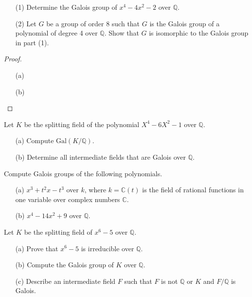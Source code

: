 \begin{prob}[F2016-Q4]
    \phantom{text}
    \begin{itemize}
        \item[(1)] Determine the Galois group of \(x^{4}-4x^{2}-2\) over \(\mathbb{Q}\).
        \item[(2)] Let \(G\) be a group of order 8 such that \(G\) is the Galois group of a polynomial of degree 4 over \(\mathbb{Q}\). Show that \(G\) is isomorphic to the Galois group in part (1).
    \end{itemize}
\end{prob}
\begin{proof}
    \begin{itemize}
        \item[(a)]
        







        \item[(b)] 
    \end{itemize}
\end{proof}


\begin{prob}[S2008-Q3]
    Let \(K\) be the splitting field of the polynomial \(X^4 - 6X^2 - 1\) over \(\mathbb{Q}\).
    \begin{itemize}
        \item[(a)] Compute \(\text{Gal}(K/\mathbb{Q})\).
        \item[(b)] Determine all intermediate fields that are Galois over \(\mathbb{Q}\).
    \end{itemize}
\end{prob}


\begin{prob}[S2010-Q3]
    Compute Galois groups of the following polynomials.
    \begin{itemize}
        \item[(a)] \(x^3 + t^2x - t^3\) over \(k\), where \(k = \mathbb{C}(t)\) is the field of rational functions in one variable over complex numbers \(\mathbb{C}\).
        \item[(b)] \(x^4 - 14x^2 + 9\) over \(\mathbb{Q}\).
    \end{itemize}
\end{prob}

\begin{prob}[S2013-Q6]
    Let \(K\) be the splitting field of \(x^6 - 5\) over \(\mathbb{Q}\).
    \begin{itemize}
        \item[(a)] Prove that \(x^6 - 5\) is irreducible over \(\mathbb{Q}\).
        \item[(b)] Compute the Galois group of \(K\) over \(\mathbb{Q}\).
        \item[(c)] Describe an intermediate field \(F\) such that \(F\) is not \(\mathbb{Q}\) or \(K\) and \(F/\mathbb{Q}\) is Galois.
    \end{itemize}
\end{prob}

